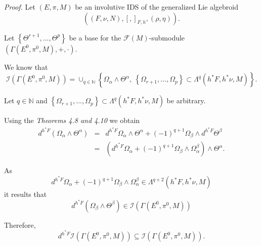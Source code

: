 \documentclass[11pt]{article}
\begin{document}
\emph{Proof. }Let $\left( E,\pi ,M\right) $ be an involutive IDS of the
generalized Lie algebroid
\begin{equation*}
\left( \left( F,\nu ,N\right) ,\left[ ,\right] _{F,h},\left( \rho ,\eta
\right) \right) .
\end{equation*}

Let $\left\{ \Theta ^{r+1},...,\Theta ^{p}\right\} $ be a base for the $%
\mathcal{F}\left( M\right) $-submodule $\left( \Gamma \left( E^{0},\pi
^{0},M\right) ,+,\cdot \right) .$

We know that
\begin{equation*}
\mathcal{I}\left( \Gamma \left( E^{0},\pi ^{0},M\right) \right) =\cup _{q\in
\mathbb{N}}\left\{ \Omega _{\alpha }\wedge \Theta ^{\alpha },~\left\{ \Omega
_{r+1},...,\Omega _{p}\right\} \subset \Lambda ^{q}\left( h^{\ast }F,h^{\ast
}\nu ,M\right) \right\} .
\end{equation*}

Let $q\in \mathbb{N}$ and $\left\{ \Omega _{r+1},...,\Omega _{p}\right\}
\subset \Lambda ^{q}\left( h^{\ast }F,h^{\ast }\nu ,M\right) $ be arbitrary.

Using the \emph{Theorems 4.8 and 4.10} we obtain
\begin{equation*}
\begin{array}{ccl}
d^{h^{\ast }F}\left( \Omega _{\alpha }\wedge \Theta ^{\alpha }\right) & = &
d^{h^{\ast }F}\Omega _{\alpha }\wedge \Theta ^{\alpha }+\left( -1\right)
^{q+1}\Omega _{\beta }\wedge d^{h^{\ast }F}\Theta ^{\beta } \\
& = & \left( d^{h^{\ast }F}\Omega _{\alpha }+\left( -1\right) ^{q+1}\Omega
_{\beta }\wedge \Omega _{\alpha }^{\beta }\right) \wedge \Theta ^{\alpha }.%
\end{array}%
\end{equation*}

As
\begin{equation*}
d^{h^{\ast }F}\Omega _{\alpha }+\left( -1\right) ^{q+1}\Omega _{\beta
}\wedge \Omega _{\alpha }^{\beta }\in \Lambda ^{q+2}\left( h^{\ast
}F,h^{\ast }\nu ,M\right)
\end{equation*}%
it results that
\begin{equation*}
d^{h^{\ast }F}\left( \Omega _{\beta }\wedge \Theta ^{\beta }\right) \in
\mathcal{I}\left( \Gamma \left( E^{0},\pi ^{0},M\right) \right)
\end{equation*}

Therefore,
\begin{equation*}
d^{h^{\ast }F}\mathcal{I}\left( \Gamma \left( E^{0},\pi ^{0},M\right)
\right) \subseteq \mathcal{I}\left( \Gamma \left( E^{0},\pi ^{0},M\right)
\right) .
\end{equation*}
\end{document}
